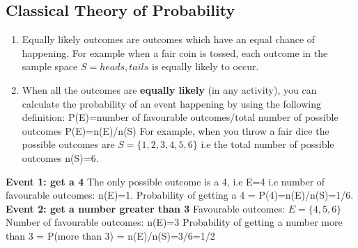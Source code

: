 \documentclass[10pt,a4paper,titlepage,twoside,openright]{report}
\begin{document}
\subsection{Classical Theory of Probability}
\begin{enumerate}
\item Equally likely outcomes are outcomes which have an equal chance of happening. For example when a fair coin is tossed, each outcome in the sample space $S = {heads, tails}$ is equally likely to occur. 
\item When all the outcomes are \textbf{equally likely} (in any activity), you can calculate the probability of an event happening by using the following definition: \newline
P(E)=number of favourable outcomes/total number of possible outcomes \newline
P(E)=n(E)/n(S) \newline
For example, when you throw a fair dice the possible outcomes are $S = \{1,2,3,4,5,6\}$ i.e the total number of possible outcomes n(S)=6. 
\end{enumerate}
\textbf{Event 1: get a 4} \newline
The only possible outcome is a 4, i.e E={4} i.e number of favourable outcomes: n(E)=1. \newline
Probability of getting a 4 = P(4)=n(E)/n(S)=1/6. \newline
\textbf{Event 2: get a number greater than 3} \newline
Favourable outcomes: $E=\{4,5,6\}$ \newline
Number of favourable outcomes: n(E)=3 \newline
Probability of getting a number more than 3 = P(more than 3) = n(E)/n(S)=3/6=1/2 \newline
\end{document}
